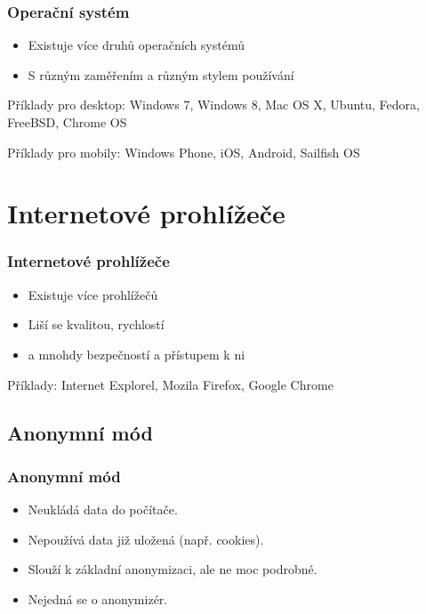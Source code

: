 \documentclass[xetex]{beamer}
\begin{document}
\begin{frame}
 	\frametitle{Operační systém} 
 	\begin{itemize} 
   		\item Existuje více druhů operačních systémů
   		\item S různým zaměřením a různým stylem používání
 	\end{itemize} 

	\bigskip

	Příklady pro desktop: Windows 7, Windows 8, Mac OS X, Ubuntu, Fedora, FreeBSD, Chrome OS

	\bigskip

	Příklady pro mobily: Windows Phone, iOS, Android, Sailfish OS 
\end{frame}

\section{Internetové prohlížeče}

\begin{frame}
	\frametitle{Internetové prohlížeče} 
	\begin{itemize} 
   		\item Existuje více prohlížečů
		\item Liší se kvalitou, rychlostí
   		\item a mnohdy bezpečností a přístupem k ni
	\end{itemize} 

	\bigskip

	Příklady: Internet Explorel, Mozila Firefox, Google Chrome
\end{frame}

\subsection{Anonymní mód}

\begin{frame}
	\frametitle{Anonymní mód} 
	\begin{itemize} 
		\item Neukládá data do počítače.
		\item Nepoužívá data již uložená (např. cookies).
		\item Slouží k základní anonymizaci, ale ne moc podrobné.
		\item Nejedná se o anonymizér.
	\end{itemize} 
\end{frame}
\end{document}

